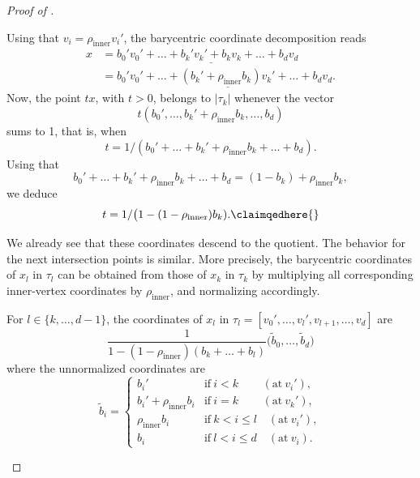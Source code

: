 \documentclass[a4paper,english,cleveref,autoref,thm-restate,nolineno]{socg-lipics-v2021}
\newcommand{\geomreal}[1] { |#1| } %
\begin{document}
\begin{proof}[Proof of ]
	\begin{claimproof}
		Using that $v_i = \rho_{\mathrm{inner}}v_i'$, the barycentric coordinate decomposition reads
		\begin{align*}
			x &= b_0'v_0'+\dots+\underline{b_k'v_k'+b_kv_k}+\dots+b_d v_d\\
			&= b_0'v_0'+\dots+\underline{(b_k'+\rho_{\mathrm{inner}}b_k)v_k'}+\dots+b_d v_d.
		\end{align*}
		Now, the point $tx$, with $t>0$, belongs to $\geomreal{\tau_k}$ whenever the vector
		\[
		t(b_0',\dots,b_k'+\rho_{\mathrm{inner}}b_k,\dots,b_d)
		\]
		sums to 1, that is, when
		\[
		t = 1/(b_0'+\dots+b_k'+\rho_{\mathrm{inner}}b_k+\dots+b_d).
		\]
		Using that 
		\[
		b_0'+\dots+b_k'+\rho_{\mathrm{inner}}b_k+\dots+b_d = (1-b_k) + \rho_{\mathrm{inner}}b_k,
		\]
		we deduce
		\[
		t = 1/\big(1-(1-\rho_{\mathrm{inner}})b_k).\claimqedhere{}
		\]
	\end{claimproof}

	We already see that these coordinates descend to the quotient. 	
	The behavior for the next intersection points is similar.
	More precisely, the barycentric coordinates of $x_{l}$ in $\tau_{l}$ can be obtained from those of $x_{k}$ in $\tau_{k}$ by multiplying all corresponding inner-vertex coordinates by $\rho_{\mathrm{inner}}$, and normalizing accordingly.
	
	\begin{claim}\label{claim:coordinates_quotient_rest}
		For $l\in\{k,\dots,d-1\}$, the coordinates of $x_l$ in $\tau_l=[v_0',\dots,v_l',v_{l+1},\dots,v_d]$ are 
		\[
		\frac{1}{1-(1-\rho_{\mathrm{inner}})(b_k+\dots+b_l)} 
		\big(\widetilde b_0, \dots, \widetilde b_d\big)
		\]
		where the unnormalized coordinates are
		\[
		\widetilde b_i =
		\begin{cases}
			b_i' & \text{if}\ i<k 
				\quad~~~~~(\text{at}\ v_i'),\\
			b_i'+ \rho_{\mathrm{inner}}b_i& \text{if}\ i=k 
				\quad~~~~~(\text{at}\ v_k'), \\
			\rho_{\mathrm{inner}}b_i & \text{if}\ k<i\leq l 
				\quad(\text{at}\ v_i'), \\
			b_i & \text{if}\ l<i\leq d 
				\quad(\text{at}\ v_i).
		\end{cases}
		\]
	\end{claim}
	

\end{proof}
\end{document}
